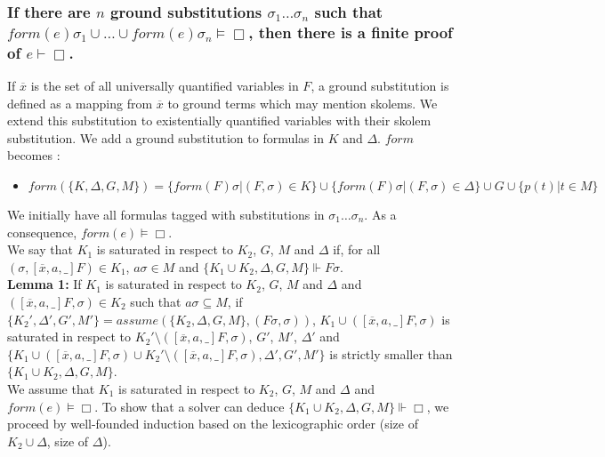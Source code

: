 \documentclass[a4paper,10pt]{report}
\newcommand{\F}{\mathit{form}}
\newcommand{\A}{\mathit{assume}}
\begin{document}
\subsubsection*{If there are $n$ ground substitutions $\sigma_1\dots\sigma_n$ such that
$\F(e)\sigma_1\cup\dots\cup\F(e)\sigma_n\vDash\Box$, then there is a finite proof of $e\vdash\Box$.}
If $\overline x$ is the set of all universally quantified variables in $F$, a ground substitution is
defined as a mapping from $\overline x$ to ground terms which may mention skolems. We extend this
substitution to existentially quantified variables with their skolem substitution.
We add a ground substitution to formulas in $K$ and $\Delta$. $\F$ becomes :
\begin{itemize}
 \item $\F(\{K,\Delta,G,M\})=\{\F(F)\sigma|(F,\sigma)\in K\}\cup
\{\F(F)\sigma|(F,\sigma)\in\Delta\}\cup G\cup\{p(t)|t\in M\}$
\end{itemize}
We initially have all formulas tagged with substitutions in $\sigma_1\dots\sigma_n$. As a consequence,
$\F(e)\vDash\Box$.\\
We say that $K_1$ is saturated in respect to $K_2$, $G$, $M$ and $\Delta$ if, for all
$(\sigma,[\overline x,a,\_]F)\in K_1$, 
$a\sigma\in M$ and $\{K_1\cup K_2,\Delta,G,M\}\Vdash F\sigma$.\\
\textbf{Lemma 1:} If $K_1$ is saturated in respect to $K_2$, $G$, $M$ and $\Delta$ and
$([\overline x,a,\_]F,\sigma)\in K_2$ such that $a\sigma\subseteq M$, if
$\{K_2',\Delta',G',M'\}=\A(\{K_2,\Delta,G,M\},(F\sigma,\sigma))$,
$K_1\cup ([\overline x,a,\_]F,\sigma)$ is saturated in respect to
$K_2'\setminus([\overline x,a,\_]F,\sigma)$, $G'$, $M'$, $\Delta'$ and
$\{K_1\cup ([\overline x,a,\_]F,\sigma)\cup K_2'\setminus([\overline x,a,\_]F,\sigma),\Delta',G',M'\}$
is strictly smaller than $\{K_1\cup K_2,\Delta,G,M\}$.\\
We assume that
$K_1$ is saturated in respect to $K_2$, $G$, $M$ and $\Delta$ and $\F(e)\vDash\Box$.
To show that a solver can deduce $\{K_1\cup K_2,\Delta,G,M\}\Vdash\Box$,
we proceed by well-founded induction based on the lexicographic order (size of $K_2\cup\Delta$,
size of $\Delta$).
\end{document}
